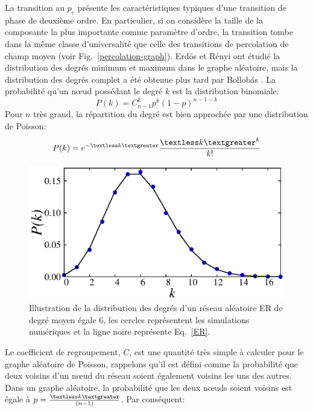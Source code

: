  La transition au $p_c$ présente les caractéristiques typiques d'une transition de phase de deuxième ordre. En particulier, si on considère la taille de la composante la plus importante comme paramètre d'ordre, la transition tombe dans la même classe d'universalité que celle des transitions de percolation de champ moyen (voir Fig.~\ref{percolation-graph}). Erdös et Rényi ont étudié la distribution des degrés minimum et maximum dans le graphe aléatoire, mais la distribution des degrés complet a été obtenue plus tard par Bollobás \cite{Bollobas1998}. La probabilité qu'un nœud possédant le degré  $k$ est la distribution binomiale:
 \begin{equation}
 P(k)=C^k_{n-1}p^k(1-p)^{n-1-k}
 \end{equation}
 Pour $n$ très grand, la répartition du degré est bien approchée par une distribution de Poisson:
 \begin{equation}
 P(k)=e^{-\textless k\textgreater}\dfrac{\textless k\textgreater^k}{k!}
 \label{ER}
 \end{equation}
 \begin{figure}[h!]
 	\centering
 	\includegraphics[scale=1]{./figures/fig-ER-dist}
 	\caption{Illustration de la distribution des degrés d'un réseau aléatoire ER de degré moyen égale $6$, les cercles représentent les simulations numériques et la ligne noire représente Eq.~\eqref{ER}.}
 	
 	\label{ER-distribution}
 \end{figure} 
 
 Le coefficient de regroupement, $C$, est une quantité très simple à calculer pour le graphe aléatoire de Poisson, rappelons qu'il est défini comme la probabilité que deux voisins d'un nœud du réseau soient également voisins les uns des autres. Dans un graphe aléatoire, la probabilité que les deux nœuds soient voisins est égale à $p=\frac{\textless k\textgreater}{(n - 1)}$. Par conséquent:
 
